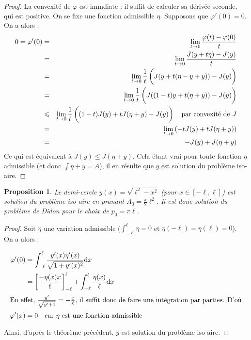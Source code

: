\documentclass[10pt,a4paper]{article}
\renewcommand{\d}{\mathrm{d}}
\renewcommand{\phi}{\varphi}
\theoremstyle{plain}
\newtheorem{prop}[thm]{Proposition}
\theoremstyle{definition}
\begin{document}
\begin{proof}
La convexité de $\phi$ est immdiate : il suffit de calculer sa dérivée seconde, qui est positive.
On se fixe une fonction admissible $\eta$. Supposons que $\phi'(0)=0$. On a alors :
\begin{eqnarray*}
0=\phi'(0) &=& \lim_{t\to 0}\dfrac{\phi(t)-\phi(0)}{t}\\
			&=& \lim_{t\to0}\frac{J(y+t\eta)-J(y)}{t}\\
			&=& \lim_{t\to0}\frac{1}{t}\left(\vphantom{\frac{1}{2}}J(y+t(\eta-y+y))-J(y)\right)\\
			&=& \lim_{t\to0}\frac{1}{t}\left(\vphantom{\frac{1}{2}}J((1-t)y+t(\eta+y))-J(y)\right)\\
			&\leqslant&\lim_{t\to0}\frac{1}{t}\left(\vphantom{\frac{1}{2}}(1-t)J(y)+tJ(\eta+y)-J(y)\right)\quad\text{par convexité de $J$}\\
			&=& \lim_{t\to0}\left(-tJ(y)+tJ(\eta+y)\right)\\
			&=& -J(y)+J(\eta+y)
\end{eqnarray*}
Ce qui est équivalent à $J(y)\leqslant J(\eta+y)$. Cela étant vrai pour toute fonction $\eta$ admissible (et donc $\int\eta+y=A$), il en résulte que $y$ est solution du problème iso-aire. 
\end{proof}




\begin{prop}
\label{prop:didon}
Le demi-cercle $y(x)=\sqrt{\ell^2-x^2}$ (pour $x\in[-\ell,\ell]$) est solution du problème iso-aire en pranant $A_0=\frac{\pi}{2}\ell^2$. Il est donc solution du problème de Didon pour le choix de $p_0=\pi \ell$.
\end{prop}



\begin{proof}
Soit $\eta$ une variation admissible ($\int_{-\ell}^\ell\eta=0$ et $\eta(-\ell)=\eta(\ell)=0$). On a alors :

\begin{align*}
\varphi'(0) &= \int_{-\ell}^\ell \frac{y'(x)\eta'(x)}{\sqrt{1+y'(x)^2}}\d x\\
			&= \left[\frac{-\eta(x) x}{\ell}\right]_{-\ell}^\ell + \int_{-\ell}^\ell\frac{\eta(x)}{\ell}\d x\\
\intertext{En effet, $\frac{y'}{\sqrt{y'+1}}=-\frac{x}{\ell}$, il suffit donc de faire une intégration par parties. D'où}
\varphi'(x)&= 0\quad\text{car }\eta\text{ est une fonction admissible}
\end{align*}

Ainsi, d'après le théorème précédent, $y$ est solution du problème iso-aire.
\end{proof}
\end{document}
